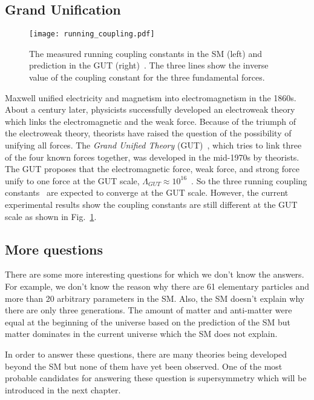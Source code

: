 
\subsection{Grand Unification}
\label{subsec:sm_grand_unification}

\begin{figure}[tbp]
    \begin{center}
        \texttt{[image: running\_coupling.pdf]}
        \caption{The measured running coupling constants in the SM (left) and prediction in the GUT (right)~\cite{Ur0ol}.
        The three lines show the inverse value of the coupling constant for the three fundamental forces.}
        \label{fig:sm_coulping_constants}
    \end{center}
\end{figure}

Maxwell unified electricity and magnetism into electromagnetism in the 1860s.
About a century later, physicists successfully developed an electroweak theory which links the electromagnetic and the weak force.
Because of the triumph of the electroweak theory, theorists have raised the question of the possibility of unifying all forces.
The \textit{Grand Unified Theory} (GUT)~\cite{Ross:1985ai}, which tries to link three of the four known forces together, was developed in the mid-1970s by theorists.
The GUT proposes that the electromagnetic force, weak force, and strong force unify to one force at the GUT scale, $\Lambda_{GUT} \approx 10^{16}$~{\GeV}.
So the three running coupling constants~\cite{Mohr:2015ccw} are expected to converge at the GUT scale.
However, the current experimental results show the coupling constants are still different at the GUT scale as shown in Fig.~\ref{fig:sm_coulping_constants}.


\subsection{More questions}
\label{subsec:sm_more_questions}
There are some more interesting questions for which we don't know the answers.
For example, we don't know the reason why there are 61 elementary particles and more than 20 arbitrary parameters in the SM.
Also, the SM doesn't explain why there are only three generations.
The amount of matter and anti-matter were equal at the beginning of the universe based on the prediction of the SM but matter dominates in the current universe which the SM does not explain.

In order to answer these questions, there are many theories being developed beyond the SM but none of them have yet been observed.
One of the most probable candidates for answering these question is supersymmetry which will be introduced in the next chapter.
